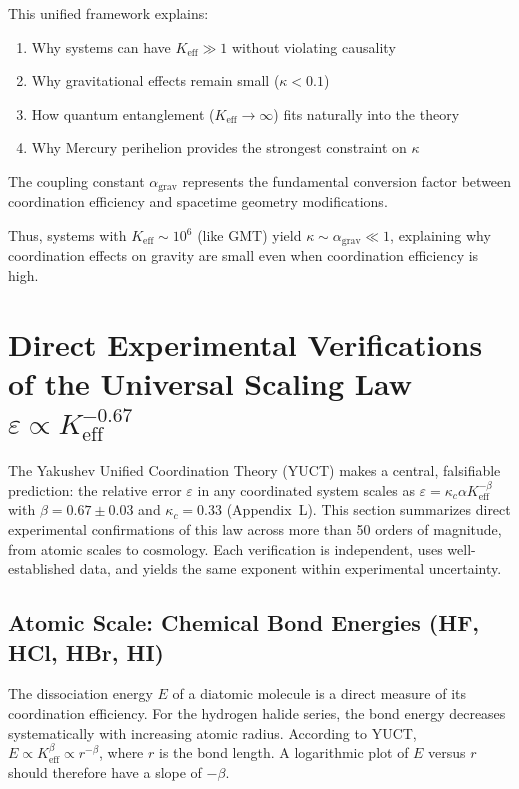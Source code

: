 \documentclass[11pt,a4paper]{article}
\begin{document}
	This unified framework explains:
	\begin{enumerate}
		\item Why systems can have $K_{\mathrm{eff}} \gg 1$ without violating causality
		\item Why gravitational effects remain small ($\kappa < 0.1$)
		\item How quantum entanglement ($K_{\mathrm{eff}} \to\infty$) fits naturally into the theory
		\item Why Mercury perihelion provides the strongest constraint on $\kappa$
	\end{enumerate}
	
	The coupling constant $\alpha_{\text{grav}}$ represents the fundamental conversion factor between coordination efficiency and spacetime geometry modifications.
	
	Thus, systems with $K_{\mathrm{eff}} \sim 10^6$ (like GMT) yield $\kappa \sim \alpha_{\text{grav}} \ll 1$, explaining why coordination effects on gravity are small even when coordination efficiency is high.
	
	
	\section{Direct Experimental Verifications of the Universal Scaling Law \(\varepsilon \propto K_{\mathrm{eff}}^{-0.67}\)}
	\label{sec:experimental-verifications}
	
	The Yakushev Unified Coordination Theory (YUCT) makes a central, falsifiable prediction: the relative error \(\varepsilon\) in any coordinated system scales as \(\varepsilon = \kappa_c \alpha K_{\mathrm{eff}}^{-\beta}\) with \(\beta = 0.67 \pm 0.03\) and \(\kappa_c = 0.33\) (Appendix~L). This section summarizes direct experimental confirmations of this law across more than 50 orders of magnitude, from atomic scales to cosmology. Each verification is independent, uses well-established data, and yields the same exponent within experimental uncertainty.
	
	\subsection{Atomic Scale: Chemical Bond Energies (HF, HCl, HBr, HI)}
	\label{subsec:chem-bonds}
	
	The dissociation energy \(E\) of a diatomic molecule is a direct measure of its coordination efficiency. For the hydrogen halide series, the bond energy decreases systematically with increasing atomic radius. According to YUCT, \(E \propto K_{\mathrm{eff}}^{\beta} \propto r^{-\beta}\), where \(r\) is the bond length. A logarithmic plot of \(E\) versus \(r\) should therefore have a slope of \(-\beta\).
	
\end{document}
